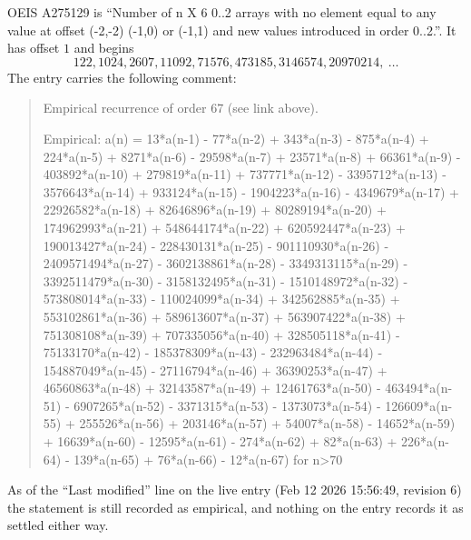 \documentclass[11pt,a4paper]{article}
\theoremstyle{plain}
\theoremstyle{definition}
\begin{document}
OEIS A275129 is ``Number of n X 6 0..2 arrays with no element equal to any value at offset (-2,-2) (-1,0) or (-1,1) and new values introduced in order 0..2.''. It has offset $1$ and begins
\[
122, 1024, 2607, 11092, 71576, 473185, 3146574, 20970214,\ \dots
\]
The entry carries the following comment:
\begin{quote}\small
Empirical recurrence of order 67 (see link above).

Empirical: a(n) = 13*a(n-1) - 77*a(n-2) + 343*a(n-3) - 875*a(n-4) + 224*a(n-5) + 8271*a(n-6) - 29598*a(n-7) + 23571*a(n-8) + 66361*a(n-9) - 403892*a(n-10) + 279819*a(n-11) + 737771*a(n-12) - 3395712*a(n-13) - 3576643*a(n-14) + 933124*a(n-15) - 1904223*a(n-16) - 4349679*a(n-17) + 22926582*a(n-18) + 82646896*a(n-19) + 80289194*a(n-20) + 174962993*a(n-21) + 548644174*a(n-22) + 620592447*a(n-23) + 190013427*a(n-24) - 228430131*a(n-25) - 901110930*a(n-26) - 2409571494*a(n-27) - 3602138861*a(n-28) - 3349313115*a(n-29) - 3392511479*a(n-30) - 3158132495*a(n-31) - 1510148972*a(n-32) - 573808014*a(n-33) - 110024099*a(n-34) + 342562885*a(n-35) + 553102861*a(n-36) + 589613607*a(n-37) + 563907422*a(n-38) + 751308108*a(n-39) + 707335056*a(n-40) + 328505118*a(n-41) - 75133170*a(n-42) - 185378309*a(n-43) - 232963484*a(n-44) - 154887049*a(n-45) - 27116794*a(n-46) + 36390253*a(n-47) + 46560863*a(n-48) + 32143587*a(n-49) + 12461763*a(n-50) - 463494*a(n-51) - 6907265*a(n-52) - 3371315*a(n-53) - 1373073*a(n-54) - 126609*a(n-55) + 255526*a(n-56) + 203146*a(n-57) + 54007*a(n-58) - 14652*a(n-59) + 16639*a(n-60) - 12595*a(n-61) - 274*a(n-62) + 82*a(n-63) + 226*a(n-64) - 139*a(n-65) + 76*a(n-66) - 12*a(n-67) for n>70
\end{quote}
As of the ``Last modified'' line on the live entry (Feb 12 2026 15:56:49, revision 6) the statement is
still recorded as empirical, and nothing on the entry records it as settled either way.
\end{document}
